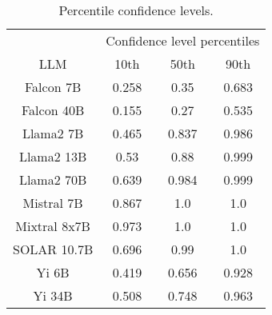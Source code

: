\begin{table*}
\centering
\begin{tabular}{c|c|c|c}
& \multicolumn{3}{c}{Confidence level percentiles} \\ 
LLM & 10th & 50th & 90th\\ \hline
Falcon 7B & 0.258 & 0.35 & 0.683\\
Falcon 40B & 0.155 & 0.27 & 0.535\\
Llama2 7B & 0.465 & 0.837 & 0.986\\
Llama2 13B & 0.53 & 0.88 & 0.999\\
Llama2 70B & 0.639 & 0.984 & 0.999\\
Mistral 7B & 0.867 & 1.0 & 1.0\\
Mixtral 8x7B & 0.973 & 1.0 & 1.0\\
SOLAR 10.7B & 0.696 & 0.99 & 1.0\\
Yi 6B & 0.419 & 0.656 & 0.928\\
Yi 34B & 0.508 & 0.748 & 0.963\\
\hline
\end{tabular}
\caption{Percentile confidence levels.}
\label{tab:percentile_conf}
\end{table*}
